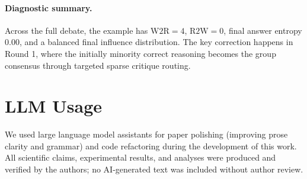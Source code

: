\paragraph{Diagnostic summary.}
Across the full debate, the example has $\mathrm{W2R}=4$, $\mathrm{R2W}=0$, final answer entropy $0.00$, and a balanced final influence distribution. The key correction happens in Round 1, where the initially minority correct reasoning becomes the group consensus through targeted sparse critique routing.


\section{LLM Usage}
\label{app:ai-usage}

We used large language model assistants for paper polishing (improving prose clarity and grammar) and code refactoring during the development of this work. All scientific claims, experimental results, and analyses were produced and verified by the authors; no AI-generated text was included without author review.
